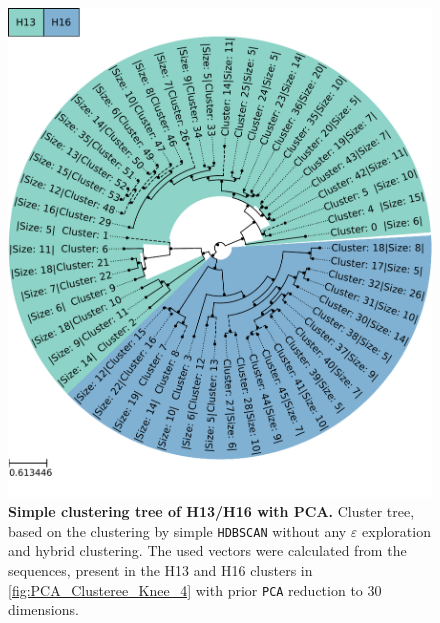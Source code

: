 \begin{figure}[!hbt]
    \centering
    \includegraphics[width=\textwidth]{PCA/Clustertree_Segment_4_H_Simple.pdf}
    \caption[Simple clustering tree of H13/H16 with PCA]{\textbf{Simple clustering tree of H13/H16 with PCA.} Cluster tree, based on the clustering by simple \texttt{HDBSCAN} without any $\varepsilon$ exploration and hybrid clustering. The used vectors were calculated from the sequences, present in the H13 and H16 clusters in \autoref{fig:PCA_Clusteree_Knee_4} with prior \texttt{PCA} reduction to 30 dimensions.}
    \label{fig:Simple_Clustertree_PCA}
\end{figure}

\vspace{1em}

